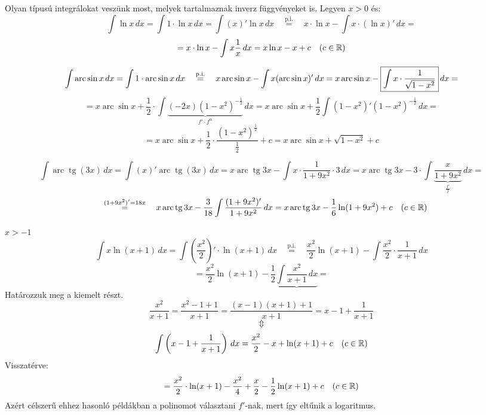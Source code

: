 \documentclass[a4paper,11.5pt]{article}
\DeclareMathOperator{\tg}{tg}
\DeclareMathOperator{\arc}{arc}
\begin{document}
	\begin{task}
		Olyan típusú integrálokat veszünk most, melyek tartalmaznak inverz függvényeket is. Legyen $x>0$ és:
		\[ \int \ln x\,dx=\int1\cdot\ln x\,dx=\int (x)'\ln x\,dx\quad \overset{\text{p.i.}}{=}\quad x\cdot\ln x-\int x\cdot(\ln x)'\,dx=\]
		\[=x\cdot\ln x-\int x\frac{1}{x}\,dx=x\ln x-x+c\quad (c\in\mathbb{R}) \]
	\end{task}
	\begin{task}
		\[ \int \arc\sin x\,dx=\int 1\cdot\arc\sin x\,dx\quad \overset{\text{p.i.}}{=}\quad x\arc\sin x-\int x(\arc\sin x)'\,dx=x\arc\sin x-\text{\fbox{$\displaystyle \int x\cdot\frac{1}{\sqrt{1-x^2}}$}}\,dx= \]
		\[= x\arc\sin x+\frac{1}{2}\cdot\int\underbrace{(-2x)(1-x^2)^{-\frac{1}{2}}}_{f'\cdot f^\alpha}\,dx=x\arc\sin x+\frac{1}{2}\int(1-x^2)'(1-x^2)^{-\frac{1}{2}}\,dx=\]
		\[=x\arc\sin x+\frac{1}{2}\cdot\frac{(1-x^2)^{\frac{1}{2}}}{\frac{1}{2}}+c=x\arc\sin x+\sqrt{1-x^2}+c \]
	\end{task}
	\begin{task}
		\[ \int\arc\tg(3x)\,dx=\int(x)'\arc\tg(3x)\,dx =x \arc\tg3x-\int x\cdot\frac{1}{1+9x^2}\cdot3\,dx=x\arc\tg3x-3\cdot\int\underbrace{\frac{x}{1+9x^2}}_{\frac{f'}{f}}\,dx=\]
		\[\quad \overset{(1+9x^2)'=18x}{=}\quad x\arc\tg3x-\frac{3}{18}\int\frac{(1+9x^2)'}{1+9x^2}\,dx=x\arc\tg3x-\frac{1}{6}\ln(1+9x^2)+c\quad (c\in\R) \]
	\end{task}
	\begin{task}$x>-1$
		\[ \int x\ln(x+1)\,dx=\int \left(\frac{x^2}{2}\right)'\cdot\ln(x+1)\,dx\quad \overset{\text{p.i.}}{=}\quad \frac{x^2}{2}\ln(x+1)-\int\frac{x^2}{2}\cdot\frac{1}{x+1}\,dx\]
		\[=\frac{x^2}{2}\ln(x+1)-\frac{1}{2}\underbrace{\int\frac{x^2}{x+1}\,dx}=\]
		Határozzuk meg a kiemelt részt.
		\[\frac{x^2}{x+1}=\frac{x^2-1+1}{x+1}=\frac{(x-1)(x+1)+1}{x+1}=x-1+\frac{1}{x+1}\]
		\[  \Updownarrow\]
		\[ \int\left(x-1+\frac{1}{x+1}\right)\,dx=\frac{x^2}{2}-x+\ln(x+1)+c \quad (c\in\mathbb{R})\]
		Visszatérve:
		\[ =\frac{x^2}{2}\cdot\ln(x+1)-\frac{x^2}{4}+\frac{x}{2}-\frac{1}{2}\ln(x+1)+c\quad (c\in\mathbb{R}) \]
		Azért célszerű ehhez hasonló példákban a polinomot választani $f'$-nak, mert így eltűnik a logaritmus.
	\end{task}
\end{document}

